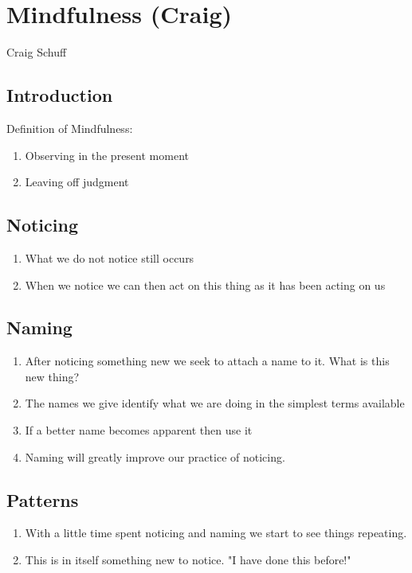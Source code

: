 \chapter{Mindfulness (Craig)}

\begin{authors}
	Craig Schuff
\end{authors}

\section{Introduction}

Definition of Mindfulness:
\begin{enumerate}
	\item Observing in the present moment
	\item Leaving off judgment
\end{enumerate}

\section{Noticing}

\begin{enumerate}
	\item What we do not notice still occurs
	\item When we notice we can then act on this thing as it has been acting on us
\end{enumerate}

\section{Naming}

\begin{enumerate}
	\item After noticing something new we seek to attach a name to it.  What is this new thing?
	\item The names we give identify what we are doing in the simplest terms available
	\item If a better name becomes apparent then use it
	\item Naming will greatly improve our practice of noticing. 
\end{enumerate}

\section{Patterns}

\begin{enumerate}
	\item With a little time spent noticing and naming we start to see things repeating.
	\item This is in itself something new to notice.  "I have done this before!"
\end{enumerate}

